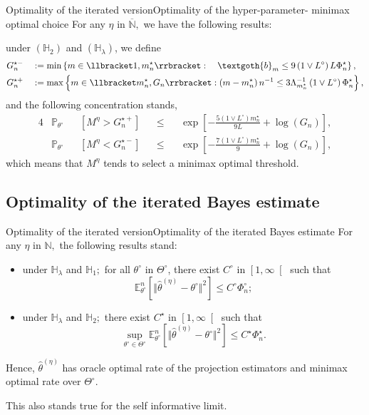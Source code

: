 \documentclass[10pt]{beamer}
\begin{document}
\begin{frame}{Optimality of the iterated version}{Optimality of the hyper-parameter- minimax optimal choice}
For any $\eta$ in $\overline{\mathbb{N}},$ we have the following results:

under $\left(\mathbb{H}_{2}\right)$ and $\left(\mathbb{H}_{\lambda}\right)$, we define
\begin{alignat*}{2}
&G_{n}^{\star-} &&:= \min\left\{m \in \llbracket 1, m_{n}^{\star} \rrbracket : \quad \textgoth{b}_{m} \leq 9 \left(1 \vee L^{\circ}\right) L \Phi_{n}^{\star}\right\},\\
&G_{n}^{\star+} &&:= \max \left\{m \in \llbracket m_{n}^{\star}, G_{n} \rrbracket : \left( m - m_{n}^{\star} \right) n^{-1} \leq 3 \Lambda_{m_{n}^{\star}}^{-1} \left(1 \vee L^{\circ}\right) \Phi_{n}^{\star}\right\},
\end{alignat*}
and the following concentration stands,
\begin{alignat*}{4}
&\mathbb{P}_{\theta^{\circ}}&&\left[M^{\eta} > G_{n}^{\star+}\right] &&\leq &&\exp\left[- \frac{5 \left(1 \vee L^{\circ}\right) m_{n}^{\star}}{9 L} + \log \left(G_{n}\right)\right],\\
&\mathbb{P}_{\theta^{\circ}}&&\left[M^{\eta} < G_{n}^{\star-}\right] &&\leq &&\exp\left[- \frac{7 \left(1 \vee L^{\circ}\right) m_{n}^{\star}}{9} + \log \left(G_{n}\right)\right],
\end{alignat*}
\textcolor{red!90!black}{which means that $M^{\eta}$ tends to select a minimax optimal threshold}.
\end{frame}


\subsection{Optimality of the iterated Bayes estimate}
\begin{frame}{Optimality of the iterated version}{Optimality of the iterated Bayes estimate}
For any $\eta$ in $\mathbb{N},$ the following results stand:
\begin{itemize}
	\item under $\mathbb{H}_{\lambda}$ and $\mathbb{H}_{1};$ for all $\theta^{\circ}$ in $\Theta^{\circ}$, there exist $C^{\circ}$ in $\left[1, \infty \right[$ such that
	\[\mathbb{E}_{\theta^{\circ}}^{n}\left[\Vert \widehat{\theta}^{\left(\eta\right)} - \theta^{\circ} \Vert^{2}\right] \leq C^{\circ} \Phi_{n}^{\circ};\]
	\item under $\mathbb{H}_{\lambda}$ and $\mathbb{H}_{2};$ there exist $C^{\star}$ in $\left[1, \infty\right[$ such that
	\[\sup\limits_{\theta^{\circ}\in \Theta^{\circ}}\mathbb{E}_{\theta^{\circ}}^{n}\left[\Vert \widehat{\theta}^{\left(\eta\right)} - \theta^{\circ} \Vert^{2}\right] \leq C^{\star} \Phi_{n}^{\star}.\]
\end{itemize}
Hence, $\widehat{\theta}^{\left(\eta\right)}$ has oracle optimal rate of the projection estimators and minimax optimal rate over $\Theta^{\circ}$.

This also stands true for the self informative limit.
\end{frame}
\end{document}
